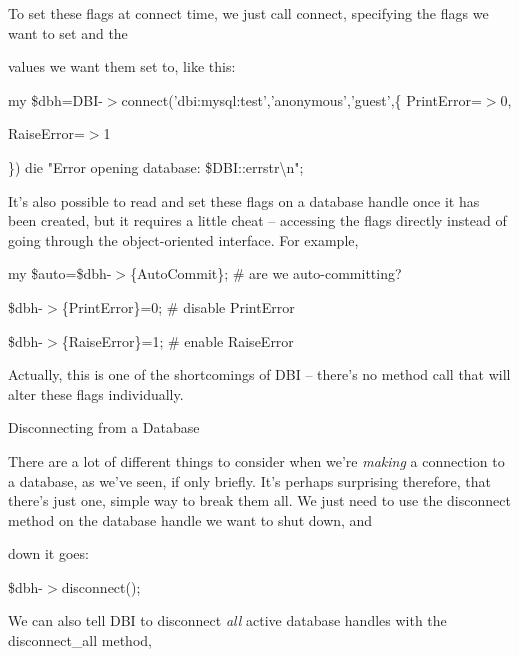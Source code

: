 \documentclass[a4paper,11pt]{book}
\begin{document}
\noindent 

\noindent 

\noindent To set these flags at connect time, we just call connect, specifying the flags we want to set and the

\noindent values we want them set to, like this:

\noindent 

\noindent my \$dbh=DBI-$>$connect('dbi:mysql:test','anonymous','guest',\{ PrintError=$>$0,

\noindent RaiseError=$>$1

\noindent \}) \textbar \textbar  die "Error opening database: \$DBI::errstr\textbackslash n";

\noindent 

\noindent It's  also  possible to  read and set  these  flags  on a  database  handle  once  it  has been  created,  but  it requires a  little cheat -- accessing  the  flags  directly  instead  of  going through  the object-oriented interface.  For example,

\noindent 

\noindent my \$auto=\$dbh-$>$\{AutoCommit\}; \# are we auto-committing?

\noindent \$dbh-$>$\{PrintError\}=0; \# disable PrintError

\noindent \$dbh-$>$\{RaiseError\}=1; \# enable RaiseError

\noindent 

\noindent Actually,  this  is one of the shortcomings  of  DBI  --  there's  no  method  call  that  will  alter  these flags individually.

\noindent 

\noindent Disconnecting from a Database

\noindent 

\noindent There  are a  lot of different things  to  consider  when  we're  \textit{making  }a  connection  to  a  database,  as  we've seen,  if only briefly.  It's perhaps  surprising  therefore,  that  there's  just  one,  simple  way to  break them all.  We just need to  use the  disconnect method  on  the  database  handle  we  want to  shut down,  and

\noindent down it goes:

\noindent 

\noindent \$dbh-$>$disconnect();

\noindent 

\noindent We can also tell DBI to disconnect \textit{all }active database handles with the disconnect\_all method,
\end{document}
